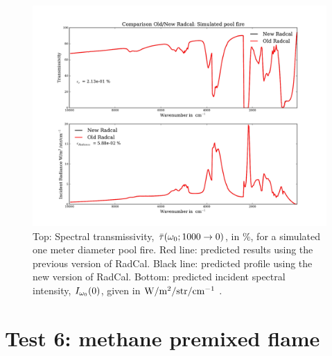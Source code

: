 \begin{figure}
\includegraphics[width=\textwidth]{Figures/Comp_old_new_Pool_fire.pdf}
\caption{Top: Spectral transmissivity, $\bar{\tau}(\omega_0; 1000 \rightarrow 0)$, in \%, for a simulated one meter diameter pool fire. Red line: predicted results using the previous version of RadCal. Black line: predicted profile using the new version of RadCal. Bottom: predicted incident spectral intensity, $I_{\omega_0}(0)$, given in $\rm W/m^{2}/str/cm^{-1}$ .\label{fig:Test5_Poolfire}}
\end{figure}


\section{Test 6: methane premixed flame}

